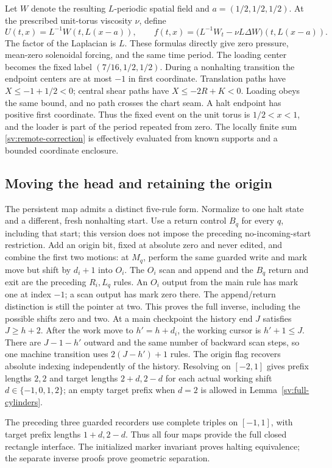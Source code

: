 Let $W$ denote the resulting $L$-periodic spatial field and
$a=(1/2,1/2,1/2)$.  At the prescribed unit-torus viscosity $\nu$,
define
\[
 U(t,x)=L^{-1}W(t,L(x-a)),\qquad
 f(t,x)=\bigl(L^{-1}W_t-\nu L\Delta W\bigr)(t,L(x-a)).
\]
The factor of the Laplacian is $L$.  These formulas directly give
zero pressure, mean-zero solenoidal forcing, and the same time period.
The loading center becomes the fixed label $(7/16,1/2,1/2)$.
During a nonhalting transition the endpoint centers are at most $-1$
in first coordinate.  Translation paths have $X\le-1+1/2<0$;
central shear paths have $X\le-2R+K<0$.  Loading obeys the same
bound, and no path crosses the chart seam.  A halt endpoint has positive
first coordinate.  Thus the fixed event on the unit torus is
$1/2<x<1$, and the loader is part of the period repeated from zero.
The locally finite sum \eqref{sv:remote-correction} is effectively
evaluated from known supports and a bounded coordinate enclosure.

\subsection{Moving the head and retaining the origin}
\label{sv:head-origin}
The persistent map admits a distinct five-rule form.  Normalize to one
halt state and a different, fresh nonhalting start.  Use a return control
$B_q$ for every $q$, including that start; this version does not impose
the preceding no-incoming-start restriction.  Add an origin
bit, fixed at absolute zero and never edited, and combine the first two
motions: at $M_q$, perform the same guarded write and mark move but
shift by $d_i+1$ into $O_i$.  The $O_i$ scan and append and the $B_q$
return and exit are the preceding $R_i,L_q$ rules.  An $O_i$ output
from the main rule has mark one at index $-1$; a scan output has mark
zero there.  The append/return distinction is still the pointer at two.
This proves the full inverse, including the possible shifts zero and
two.  At a main checkpoint the history end $J$ satisfies $J\ge h+2$.
After the work move to $h'=h+d_i$, the working cursor is $h'+1\le J$.
There are $J-1-h'$ outward and the same number of backward scan steps,
so one machine transition uses $2(J-h')+1$ rules.  The origin flag
recovers absolute indexing independently of the history.  Resolving
on $[-2,1]$ gives prefix lengths $2,2$ and target lengths $2+d,2-d$
for each actual working shift $d\in\{-1,0,1,2\}$; an empty target
prefix when $d=2$ is allowed in Lemma~\ref{sv:full-cylinders}.

The preceding three guarded recorders use complete triples on $[-1,1]$, with target
prefix lengths $1+d,2-d$.  Thus all four maps provide the full closed
rectangle interface.  The initialized marker invariant proves halting
equivalence; the separate inverse proofs prove geometric separation.

